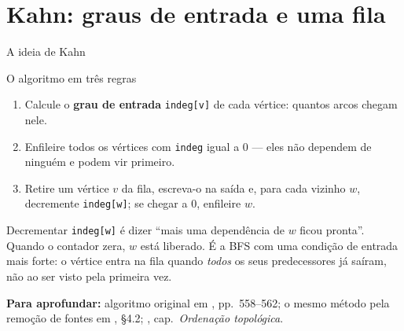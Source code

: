 \documentclass[aspectratio=169]{beamer}
\newcommand{\fonte}[1]{%
  \vfill
  {\tiny\color{gray!55!black}\textbf{Para aprofundar:} #1\par}%
}
\begin{document}
\section{Kahn: graus de entrada e uma fila}

\begin{frame}{A ideia de Kahn}
  \begin{block}{O algoritmo em três regras}
    {\small
    \begin{enumerate}\small
      \item Calcule o \textbf{grau de entrada} \texttt{indeg[v]} de cada
            vértice: quantos arcos chegam nele.
      \item Enfileire todos os vértices com \texttt{indeg} igual a 0 --- eles
            não dependem de ninguém e podem vir primeiro.
      \item Retire um vértice $v$ da fila, escreva-o na saída e, para cada
            vizinho $w$, decremente \texttt{indeg[w]}; se chegar a 0,
            enfileire $w$.
    \end{enumerate}}
  \end{block}
  {\scriptsize Decrementar \texttt{indeg[w]} é dizer ``mais uma dependência de
  $w$ ficou pronta''. Quando o contador zera, $w$ está liberado. É a BFS com
  uma condição de entrada mais forte: o vértice entra na fila quando
  \emph{todos} os seus predecessores já saíram, não ao ser visto pela primeira vez.}
  \fonte{algoritmo original em \cite{kahn1962topological}, pp.~558--562; o mesmo método pela
  remoção de fontes em \cite{levitin2012introduction}, §4.2; \cite{feofiloff2020algoritmos}, cap.\ \emph{Ordenação topológica}.}
\end{frame}
\end{document}
